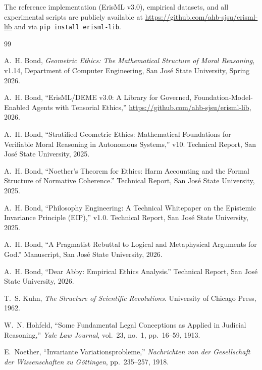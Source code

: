 \documentclass[12pt,letterpaper]{article}
\theoremstyle{definition}
\theoremstyle{remark}
\begin{document}
The reference implementation (ErisML v3.0), empirical datasets, and all experimental scripts are publicly available at \url{https://github.com/ahb-sjsu/erisml-lib} and via \texttt{pip install erisml-lib}.

\begin{thebibliography}{99}

A.~H. Bond, \emph{Geometric Ethics: The Mathematical Structure of Moral Reasoning}, v1.14, Department of Computer Engineering, San Jos\'{e} State University, Spring 2026.

A.~H. Bond, ``ErisML/DEME v3.0: A Library for Governed, Foundation-Model-Enabled Agents with Tensorial Ethics,'' \url{https://github.com/ahb-sjsu/erisml-lib}, 2026.

A.~H. Bond, ``Stratified Geometric Ethics: Mathematical Foundations for Verifiable Moral Reasoning in Autonomous Systems,'' v10. Technical Report, San Jos\'{e} State University, 2025.

A.~H. Bond, ``Noether's Theorem for Ethics: Harm Accounting and the Formal Structure of Normative Coherence.'' Technical Report, San Jos\'{e} State University, 2025.

A.~H. Bond, ``Philosophy Engineering: A Technical Whitepaper on the Epistemic Invariance Principle (EIP),'' v1.0. Technical Report, San Jos\'{e} State University, 2025.

A.~H. Bond, ``A Pragmatist Rebuttal to Logical and Metaphysical Arguments for God.'' Manuscript, San Jos\'{e} State University, 2026.

A.~H. Bond, ``Dear Abby: Empirical Ethics Analysis.'' Technical Report, San Jos\'{e} State University, 2026.

T.~S. Kuhn, \emph{The Structure of Scientific Revolutions}. University of Chicago Press, 1962.

W.~N. Hohfeld, ``Some Fundamental Legal Conceptions as Applied in Judicial Reasoning,'' \emph{Yale Law Journal}, vol.~23, no.~1, pp.~16--59, 1913.

E.~Noether, ``Invariante Variationsprobleme,'' \emph{Nachrichten von der Gesellschaft der Wissenschaften zu G\"{o}ttingen}, pp.~235--257, 1918.


\end{thebibliography}
\end{document}

